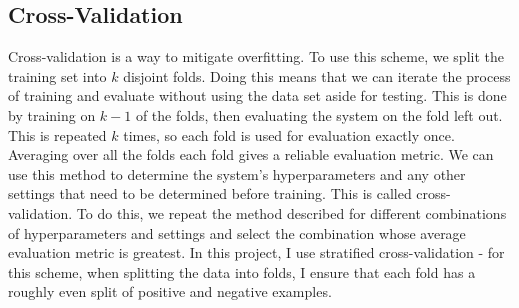 \documentclass[12pt,a4paper,twoside,openright]{report}
\begin{document}
\subsection{Cross-Validation} \label{cross-validation}
Cross-validation is a way to mitigate overfitting. To use this scheme, we split the training set into $k$ disjoint folds. Doing this means that we can iterate the process of training and evaluate without using the data set aside for testing. This is done by training on $k-1$ of the folds, then evaluating the system on the fold left out. This is repeated $k$ times, so each fold is used for evaluation exactly once. Averaging over all the folds each fold gives a reliable evaluation metric. We can use this method to determine the system's hyperparameters and any other settings that need to be determined before training. This is called cross-validation. To do this, we repeat the method described for different combinations of hyperparameters and settings and select the combination whose average evaluation metric is greatest. In this project, I use stratified cross-validation - for this scheme, when splitting the data into folds, I ensure that each fold has a roughly even split of positive and negative examples.
\end{document}
